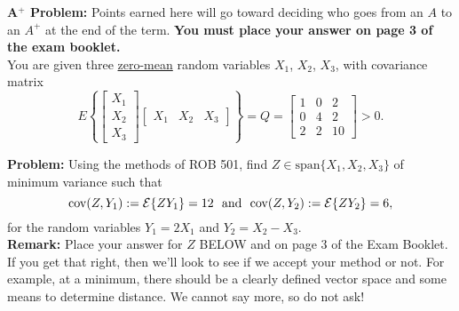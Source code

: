 \documentclass[letterpaper]{article}
\newcommand{\spanof}[1]{\textrm{span} \{ #1 \}}
\begin{document}
%

  \textbf{A$^+$ Problem: } Points earned here will go toward deciding who goes from an $A$ to an $A^+$ at the end of the term. \textbf{You must place your answer on page 3 of the exam booklet.}\\

 You are given three \uline{zero-mean} random variables $X_1$, $X_2$, $X_3$, with covariance matrix $$ E\left\{ \left[ \begin{array}{c} X_1 \\ X_2 \\ X_3   \end{array} \right]  \left[ \begin{array}{ccc} X_1 & X_2 & X_3   \end{array} \right] \right\}=Q=\left[ \begin{array}{rrr}1&0&2\\0&4&2\\2&2&10\end{array} \right]>0.$$

\noindent \textbf{Problem:}  Using the methods of ROB 501, find $Z\in \spanof{X_1,X_2,X_3}$ of minimum variance such that
$${\rm cov}(Z,Y_1):={\cal E}\{ZY_1\} = 12 ~~ \text{and} ~~{\rm cov}(Z,Y_2):={\cal E}\{Z Y_2\} = 6,$$ for the random variables $Y_1=2X_1$ and $Y_2=X_2-X_3$.\\

\noindent \textbf{Remark:}  Place your answer for $Z$ BELOW and on page 3 of the Exam Booklet. If you get that right, then we'll look to see if we accept your method or not. For example, at a minimum, there should be a clearly defined vector space and some means to determine distance. We cannot say more, so do not ask!\\
\end{document}
